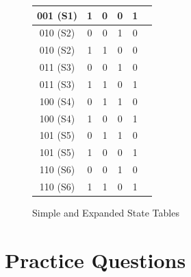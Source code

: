 \documentclass[12pt]{article}
\begin{document}
\begin{figure}[H]
{{\begin{tabular}{|c|c|c|c|c|c|}
				001 (S1)             & 1              & 0                & 0                & 1                \\
				\hline
				010 (S2)             & 0              & 0                & 1                & 0                \\
				010 (S2)             & 1              & 1                & 0                & 0                \\
				\hline
				011 (S3)             & 0              & 0                & 1                & 0                \\
				011 (S3)             & 1              & 1                & 0                & 1                \\
				\hline
				100 (S4)             & 0              & 1                & 1                & 0                \\
				100 (S4)             & 1              & 0                & 0                & 1                \\
				\hline
				101 (S5)             & 0              & 1                & 1                & 0                \\
				101 (S5)             & 1              & 0                & 0                & 1                \\
				\hline
				110 (S6)             & 0              & 0                & 1                & 0                \\
				110 (S6)             & 1              & 1                & 0                & 1                \\
				\hline
			\end{tabular}
		}
	}
	\caption{Simple and Expanded State Tables}
\end{figure}

\section*{Practice Questions}
\end{document}
